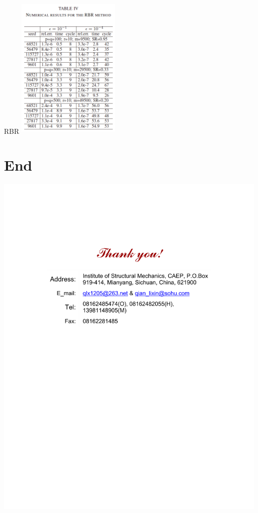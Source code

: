 \documentclass[slidestop, compress, mathserif, UTF8]{beamer}
\numberwithin{equation}{section}                                        %
\begin{document}
			\begin{frame}[t]{RBR}
				\centering
					\includegraphics[width=5cm,height=7cm]{src//4.png}
			\end{frame}
	\section*{End}                              %
		\begin{frame}
			\vspace{35mm}                       %
			\centering                          %
				\includegraphics{src//Thanks.pdf}    %
		\end{frame}
\end{document}
